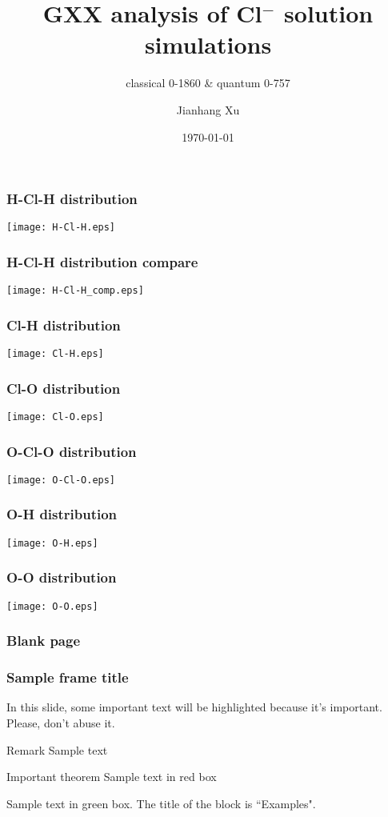 \documentclass{beamer}
\title{GXX analysis of Cl$^-$ solution simulations}
\subtitle{classical 0-1860 \& quantum 0-757}
\author{Jianhang Xu}
\institute{Temple Universiy}
\date{\today}
\begin{document}
\frame{\titlepage}

\begin{frame}
\frametitle{H-Cl-H distribution}
\texttt{[image: H-Cl-H.eps]}
\end{frame}

\begin{frame}
\frametitle{H-Cl-H distribution compare}
\texttt{[image: H-Cl-H\_comp.eps]}
\end{frame}

\begin{frame}
\frametitle{Cl-H distribution}
\texttt{[image: Cl-H.eps]}
\end{frame}

\begin{frame}
\frametitle{Cl-O distribution}
\texttt{[image: Cl-O.eps]}
\end{frame}

\begin{frame}
\frametitle{O-Cl-O distribution}
\texttt{[image: O-Cl-O.eps]}
\end{frame}

\begin{frame}
\frametitle{O-H distribution}
\texttt{[image: O-H.eps]}
\end{frame}

\begin{frame}
\frametitle{O-O distribution}
\texttt{[image: O-O.eps]}
\end{frame}

\begin{frame}
\frametitle{Blank page}
\end{frame}

\begin{frame}
\frametitle{Sample frame title}
 
In this slide, some important text will be
\alert{highlighted} because it's important.
Please, don't abuse it.
 
\begin{block}{Remark}
Sample text
\end{block}
 
\begin{alertblock}{Important theorem}
Sample text in red box
\end{alertblock}
 
\begin{examples}
Sample text in green box. The title of the block is ``Examples".
\end{examples}
\end{frame}
\end{document}
